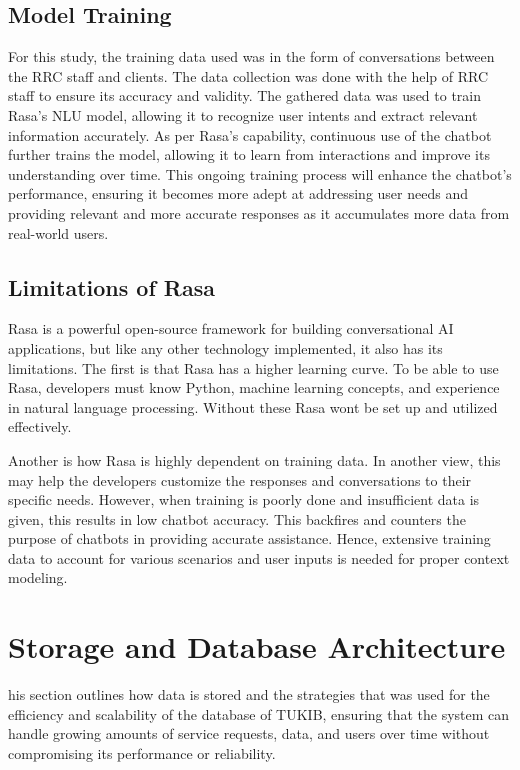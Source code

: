 \subsection{Model Training}

For this study, the training data used was in the form of conversations between the RRC staff and clients. The data collection was done with the help of RRC staff to ensure its accuracy and validity. The gathered data was used to train Rasa’s NLU model, allowing it to recognize user intents and extract relevant information accurately. As per Rasa’s capability, continuous use of the chatbot further trains the model, allowing it to learn from interactions and improve its understanding over time. This ongoing training process will enhance the chatbot’s performance, ensuring it becomes more adept at addressing user needs and providing relevant and more accurate responses as it accumulates more data from real-world users.

\subsection {Limitations of Rasa}

Rasa is a powerful open-source framework for building conversational AI applications, but like any other technology implemented, it also has its limitations. The first is that Rasa has a higher learning curve. To be able to use Rasa, developers must know Python, machine learning concepts, and experience in natural language processing. Without these Rasa wont be set up and utilized effectively. 

Another is how Rasa is highly dependent on training data. In another view, this may help the developers customize the responses and conversations to their specific needs. However, when training is poorly done and insufficient data is given, this results in low chatbot accuracy. This backfires and counters the purpose of chatbots in providing accurate assistance. Hence, extensive training data to account for various scenarios and user inputs is needed for proper context modeling.

\section{Storage and Database Architecture}

his section outlines how data is stored and the strategies that was used for the efficiency and scalability of the database of TUKIB, ensuring that the system can handle growing amounts of service requests, data, and users over time without compromising its performance or reliability.

